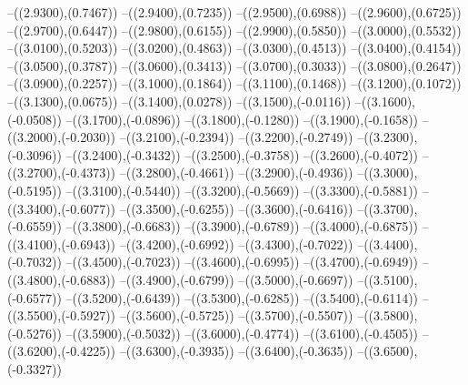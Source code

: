 {	--({\sx*(2.9300)},{\sy*(0.7467)})
	--({\sx*(2.9400)},{\sy*(0.7235)})
	--({\sx*(2.9500)},{\sy*(0.6988)})
	--({\sx*(2.9600)},{\sy*(0.6725)})
	--({\sx*(2.9700)},{\sy*(0.6447)})
	--({\sx*(2.9800)},{\sy*(0.6155)})
	--({\sx*(2.9900)},{\sy*(0.5850)})
	--({\sx*(3.0000)},{\sy*(0.5532)})
	--({\sx*(3.0100)},{\sy*(0.5203)})
	--({\sx*(3.0200)},{\sy*(0.4863)})
	--({\sx*(3.0300)},{\sy*(0.4513)})
	--({\sx*(3.0400)},{\sy*(0.4154)})
	--({\sx*(3.0500)},{\sy*(0.3787)})
	--({\sx*(3.0600)},{\sy*(0.3413)})
	--({\sx*(3.0700)},{\sy*(0.3033)})
	--({\sx*(3.0800)},{\sy*(0.2647)})
	--({\sx*(3.0900)},{\sy*(0.2257)})
	--({\sx*(3.1000)},{\sy*(0.1864)})
	--({\sx*(3.1100)},{\sy*(0.1468)})
	--({\sx*(3.1200)},{\sy*(0.1072)})
	--({\sx*(3.1300)},{\sy*(0.0675)})
	--({\sx*(3.1400)},{\sy*(0.0278)})
	--({\sx*(3.1500)},{\sy*(-0.0116)})
	--({\sx*(3.1600)},{\sy*(-0.0508)})
	--({\sx*(3.1700)},{\sy*(-0.0896)})
	--({\sx*(3.1800)},{\sy*(-0.1280)})
	--({\sx*(3.1900)},{\sy*(-0.1658)})
	--({\sx*(3.2000)},{\sy*(-0.2030)})
	--({\sx*(3.2100)},{\sy*(-0.2394)})
	--({\sx*(3.2200)},{\sy*(-0.2749)})
	--({\sx*(3.2300)},{\sy*(-0.3096)})
	--({\sx*(3.2400)},{\sy*(-0.3432)})
	--({\sx*(3.2500)},{\sy*(-0.3758)})
	--({\sx*(3.2600)},{\sy*(-0.4072)})
	--({\sx*(3.2700)},{\sy*(-0.4373)})
	--({\sx*(3.2800)},{\sy*(-0.4661)})
	--({\sx*(3.2900)},{\sy*(-0.4936)})
	--({\sx*(3.3000)},{\sy*(-0.5195)})
	--({\sx*(3.3100)},{\sy*(-0.5440)})
	--({\sx*(3.3200)},{\sy*(-0.5669)})
	--({\sx*(3.3300)},{\sy*(-0.5881)})
	--({\sx*(3.3400)},{\sy*(-0.6077)})
	--({\sx*(3.3500)},{\sy*(-0.6255)})
	--({\sx*(3.3600)},{\sy*(-0.6416)})
	--({\sx*(3.3700)},{\sy*(-0.6559)})
	--({\sx*(3.3800)},{\sy*(-0.6683)})
	--({\sx*(3.3900)},{\sy*(-0.6789)})
	--({\sx*(3.4000)},{\sy*(-0.6875)})
	--({\sx*(3.4100)},{\sy*(-0.6943)})
	--({\sx*(3.4200)},{\sy*(-0.6992)})
	--({\sx*(3.4300)},{\sy*(-0.7022)})
	--({\sx*(3.4400)},{\sy*(-0.7032)})
	--({\sx*(3.4500)},{\sy*(-0.7023)})
	--({\sx*(3.4600)},{\sy*(-0.6995)})
	--({\sx*(3.4700)},{\sy*(-0.6949)})
	--({\sx*(3.4800)},{\sy*(-0.6883)})
	--({\sx*(3.4900)},{\sy*(-0.6799)})
	--({\sx*(3.5000)},{\sy*(-0.6697)})
	--({\sx*(3.5100)},{\sy*(-0.6577)})
	--({\sx*(3.5200)},{\sy*(-0.6439)})
	--({\sx*(3.5300)},{\sy*(-0.6285)})
	--({\sx*(3.5400)},{\sy*(-0.6114)})
	--({\sx*(3.5500)},{\sy*(-0.5927)})
	--({\sx*(3.5600)},{\sy*(-0.5725)})
	--({\sx*(3.5700)},{\sy*(-0.5507)})
	--({\sx*(3.5800)},{\sy*(-0.5276)})
	--({\sx*(3.5900)},{\sy*(-0.5032)})
	--({\sx*(3.6000)},{\sy*(-0.4774)})
	--({\sx*(3.6100)},{\sy*(-0.4505)})
	--({\sx*(3.6200)},{\sy*(-0.4225)})
	--({\sx*(3.6300)},{\sy*(-0.3935)})
	--({\sx*(3.6400)},{\sy*(-0.3635)})
	--({\sx*(3.6500)},{\sy*(-0.3327)})
}
